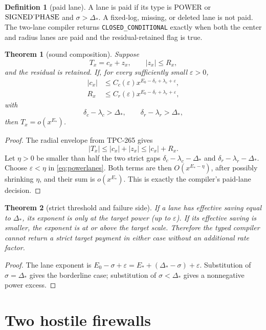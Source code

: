 \documentclass[11pt]{article}
\newtheorem{theorem}{Theorem}
\theoremstyle{definition}
\newtheorem{definition}{Definition}
\newcommand{\Pow}{\mathrm{POWER}}
\newcommand{\Phase}{\mathrm{SIGNED\mathchar`\_PHASE}}
\begin{document}
\begin{definition}[paid lane]
A lane is paid if its type is $\Pow$ or $\Phase$ and
$\sigma>\Delta_*$.  A fixed-log, missing, or deleted lane is not paid.  The
two-lane compiler returns \texttt{CLOSED\_CONDITIONAL} exactly when both the
center and radius lanes are paid and the residual-retained flag is true.
\end{definition}

\begin{theorem}[sound composition]
Suppose
\[
 T_x=c_x+z_x, \qquad |z_x|\leq R_x,
\]
and the residual is retained.  If, for every sufficiently small $\varepsilon>0$,
\begin{align}
 |c_x|&\leq C_c(\varepsilon)x^{E_0-\delta_c+\lambda_c+\varepsilon},\\
 R_x&\leq C_r(\varepsilon)x^{E_0-\delta_r+\lambda_r+\varepsilon},
 \label{eq:powerlanes}
\end{align}
with
\[
 \delta_c-\lambda_c>\Delta_*, \qquad
 \delta_r-\lambda_r>\Delta_*,
 \]
then $T_x=o(x^{E_*})$.
\end{theorem}

\begin{proof}
The radial envelope from TPC-265 gives
\[
 |T_x|\leq |c_x|+|z_x|\leq |c_x|+R_x.
\]
Let $\eta>0$ be smaller than half the two strict gaps
$\delta_c-\lambda_c-\Delta_*$ and
$\delta_r-\lambda_r-\Delta_*$.  Choose $\varepsilon<\eta$ in
\eqref{eq:powerlanes}.  Both terms are then
$O(x^{E_* -\eta})$, after possibly shrinking $\eta$, and their sum is
$o(x^{E_*})$.  This is exactly the compiler's paid-lane decision.
\end{proof}

\begin{theorem}[strict threshold and failure side]
If a lane has effective saving equal to $\Delta_*$, its exponent is only at
the target power (up to $\varepsilon$).  If its effective saving is smaller,
the exponent is at or above the target scale.  Therefore the typed compiler
cannot return a strict target payment in either case without an additional
rate factor.
\end{theorem}

\begin{proof}
The lane exponent is $E_0-\sigma+\varepsilon=E_*+(\Delta_*-\sigma)+\varepsilon$.
Substitution of $\sigma=\Delta_*$ gives the borderline case; substitution of
$\sigma<\Delta_*$ gives a nonnegative power excess.
\end{proof}

\section{Two hostile firewalls}
\end{document}
